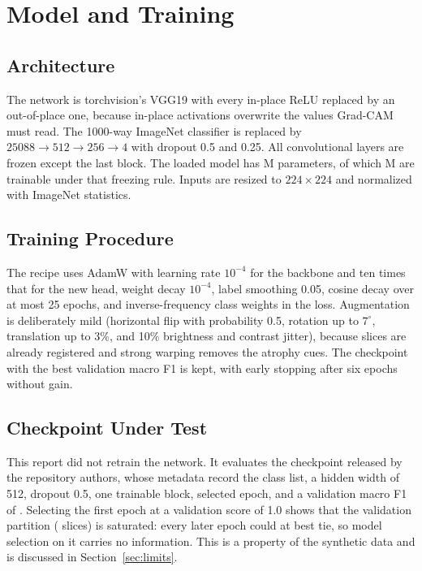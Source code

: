 \documentclass[conference]{IEEEtran}
\begin{document}
\section{Model and Training}
\subsection{Architecture}
The network is torchvision's VGG19 with every in-place ReLU replaced by an out-of-place one, because in-place activations overwrite the values Grad-CAM must read. The 1000-way ImageNet classifier is replaced by $25088\rightarrow512\rightarrow256\rightarrow4$ with dropout 0.5 and 0.25. All convolutional layers are frozen except the last block. The loaded model has \ParamsTotalM{} M parameters, of which \ParamsTrainM{} M are trainable under that freezing rule. Inputs are resized to $224\times224$ and normalized with ImageNet statistics.

\subsection{Training Procedure}
The recipe uses AdamW with learning rate $10^{-4}$ for the backbone and ten times that for the new head, weight decay $10^{-4}$, label smoothing 0.05, cosine decay over at most 25 epochs, and inverse-frequency class weights in the loss. Augmentation is deliberately mild (horizontal flip with probability 0.5, rotation up to $7^\circ$, translation up to 3\%, and 10\% brightness and contrast jitter), because slices are already registered and strong warping removes the atrophy cues. The checkpoint with the best validation macro F1 is kept, with early stopping after six epochs without gain.

\subsection{Checkpoint Under Test}
This report did not retrain the network. It evaluates the checkpoint released by the repository authors, whose metadata record the class list, a hidden width of 512, dropout 0.5, one trainable block, \CkEpochWord{} selected epoch, and a validation macro F1 of \CkValScore{}. Selecting the first epoch at a validation score of 1.0 shows that the validation partition (\EValN{} slices) is saturated: every later epoch could at best tie, so model selection on it carries no information. This is a property of the synthetic data and is discussed in Section~\ref{sec:limits}.
\end{document}
